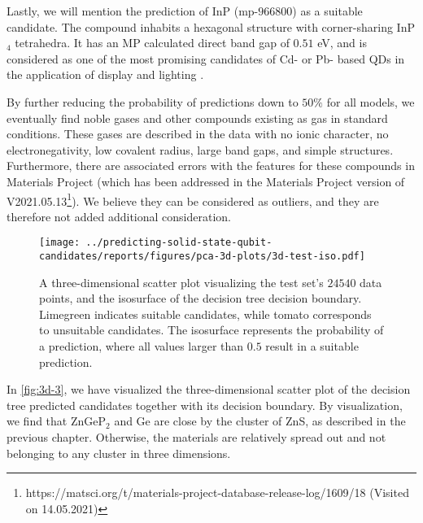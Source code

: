 Lastly, we will mention the prediction of InP (mp-$966800$) as a suitable candidate. The compound inhabits a hexagonal structure with corner-sharing InP$_4$ tetrahedra. It has an MP calculated direct band gap of $0.51$ eV, and is considered as one of the most promising candidates of Cd- or Pb- based QDs in the application of display and lighting \cite{Zhang2020a, Won2019}.

By further reducing the probability of predictions down to $50\%$ for all models, we eventually find noble gases and other compounds existing as gas in standard conditions. These gases are described in the data with no ionic character, no electronegativity, low covalent radius, large band gaps, and simple structures. Furthermore, there are associated errors with the features for these compounds in Materials Project (which has been addressed in the Materials Project version of V2021.05.13\footnote{https://matsci.org/t/materials-project-database-release-log/1609/18 (Visited on 14.05.2021)}). We believe they can be considered as outliers, and they are therefore not added additional consideration.


\begin{figure}[ht!]
    \centering
    \texttt{[image: ../predicting-solid-state-qubit-candidates/reports/figures/pca-3d-plots/3d-test-iso.pdf]}
    \vspace*{-130mm}
    \caption{A three-dimensional scatter plot visualizing the test set's $24540$ data points, and the isosurface of the decision tree decision boundary. Limegreen indicates suitable candidates, while tomato corresponds to unsuitable candidates. The isosurface represents the probability of a prediction, where all values larger than $0.5$ result in a suitable prediction.}
    \label{fig:3d-3}
\end{figure}

In \autoref{fig:3d-3}, we have visualized the three-dimensional scatter plot of the decision tree predicted candidates together with its decision boundary. By visualization, we find that ZnGeP$_2$ and Ge are close by the cluster of ZnS, as described in the previous chapter. Otherwise, the materials are relatively spread out and not belonging to any cluster in three dimensions.

